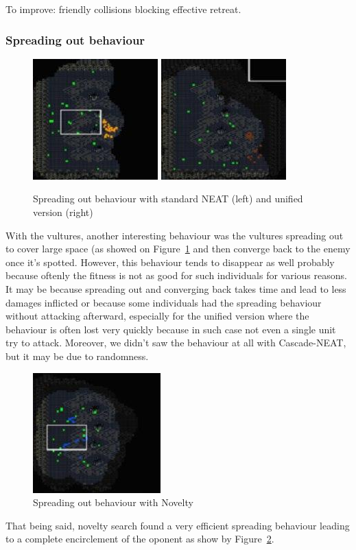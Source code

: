 To improve: friendly collisions blocking effective retreat.

\subsubsection{Spreading out behaviour}\label{subsec:spreading}

\begin{figure}
    \includegraphics[width=.15\textwidth]{figures/spreading_behaviour_standard_neat}
    \includegraphics[width=.15\textwidth]{figures/spreading_behaviour_unified}
    \caption{Spreading out behaviour with standard NEAT (left) and unified version (right)}\label{fig:spreading-behaviour}
\end{figure}

With the vultures, another interesting behaviour was the vultures spreading out to cover large space
(as showed on Figure~\ref{fig:spreading-behaviour}
and then converge back to the enemy once it's spotted. However, this behaviour tends to disappear as
well probably because oftenly the fitness is not as good for such individuals for various reasons.
It may be because spreading out and converging back takes time and lead to less damages inflicted
or because some individuals had the spreading behaviour without attacking afterward, especially
for the unified version where the behaviour is often lost very quickly because in such case not
even a single unit try to attack.
Moreover, we didn't saw the behaviour at all with Cascade-NEAT, but it may be due to randomness.

\begin{figure}
    \includegraphics[width=.15\textwidth]{figures/spreading_behaviour_novelty}
    \caption{Spreading out behaviour with Novelty}\label{fig:spreading-behaviour-novelty}
\end{figure}

That being said, novelty search found a very efficient spreading behaviour leading to a complete
encirclement of the oponent as show by Figure~\ref{fig:spreading-behaviour-novelty}.

